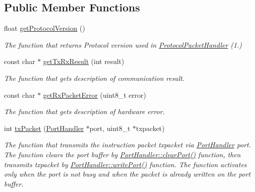 \subsection*{Public Member Functions}
\begin{DoxyCompactItemize}
\item 
float \hyperlink{classmercury_1_1_protocol_packet_handler_a79099f3c0ebc35a9198ca88ab3bfb284}{get\+Protocol\+Version} ()
\begin{DoxyCompactList}\small\item\em The function that returns Protocol version used in \hyperlink{classmercury_1_1_protocol_packet_handler}{Protocol\+Packet\+Handler} (1.) \end{DoxyCompactList}\item 
const char $\ast$ \hyperlink{classmercury_1_1_protocol_packet_handler_a9c963a7033794c15b4d51ccf7455897f}{get\+Tx\+Rx\+Result} (int result)
\begin{DoxyCompactList}\small\item\em The function that gets description of communication result. \end{DoxyCompactList}\item 
const char $\ast$ \hyperlink{classmercury_1_1_protocol_packet_handler_a0567896a3552cd6bea62e81f2b42741e}{get\+Rx\+Packet\+Error} (uint8\+\_\+t error)
\begin{DoxyCompactList}\small\item\em The function that gets description of hardware error. \end{DoxyCompactList}\item 
int \hyperlink{classmercury_1_1_protocol_packet_handler_a245f01395d9684bc58788e8a06de3ffc}{tx\+Packet} (\hyperlink{classmercury_1_1_port_handler}{Port\+Handler} $\ast$port, uint8\+\_\+t $\ast$txpacket)
\begin{DoxyCompactList}\small\item\em The function that transmits the instruction packet txpacket via \hyperlink{classmercury_1_1_port_handler}{Port\+Handler} port.  The function clears the port buffer by \hyperlink{classmercury_1_1_port_handler_accf37c8838c1ce3042a0127ceeb89c48}{Port\+Handler\+::clear\+Port()} function,  then transmits txpacket by \hyperlink{classmercury_1_1_port_handler_ad26c3a106d6b668b6fae3d2f0afeab9e}{Port\+Handler\+::write\+Port()} function.  The function activates only when the port is not busy and when the packet is already written on the port buffer. \end{DoxyCompactList}\item 

\end{DoxyCompactItemize}
